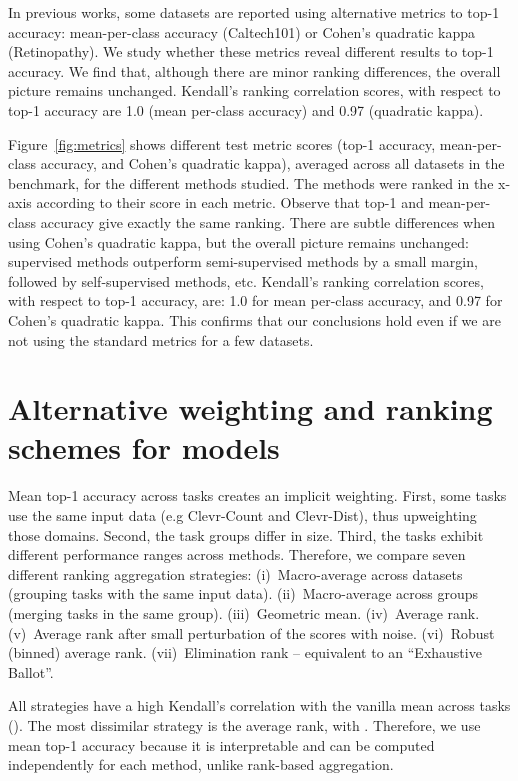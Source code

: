 \documentclass{article}
\begin{document}
In previous works, some datasets are
reported using alternative metrics to top-1 accuracy:
mean-per-class accuracy (Caltech101)
or Cohen's quadratic kappa (Retinopathy).
We study whether these metrics reveal different results to top-1 accuracy.
We find that, although there are minor ranking differences, the overall picture remains unchanged.
Kendall's ranking correlation scores, with respect to top-1 accuracy are 1.0 (mean per-class accuracy) and 0.97 (quadratic kappa).

Figure~\ref{fig:metrics} shows different test metric scores
(top-1 accuracy, mean-per-class accuracy, and Cohen's quadratic kappa),
averaged across all datasets in the benchmark, for the different methods
studied. The methods were ranked in the x-axis according to their score 
in each metric.
Observe that top-1 and mean-per-class accuracy give exactly the same
ranking. There are subtle differences when using
Cohen's quadratic kappa, but the overall picture
remains unchanged: supervised methods outperform semi-supervised methods
by a small margin, followed by self-supervised methods, etc.
Kendall's ranking correlation scores, with respect to top-1 accuracy, are:
1.0 for mean per-class accuracy, and 0.97 for Cohen's quadratic kappa.
This confirms that our conclusions hold even if we are not using the standard
metrics for a few datasets.


\clearpage
\section{Alternative weighting and ranking schemes for models\label{app:alt-model-ranking}}

Mean top-1 accuracy across tasks creates an implicit weighting.
First, some tasks use the same input data (e.g Clevr-Count and Clevr-Dist), thus upweighting those domains.
Second, the task groups differ in size.
Third, the tasks exhibit different performance ranges across methods.
Therefore, we compare seven different ranking aggregation strategies:
(i)~Macro-average across datasets (grouping tasks with the same input data).
(ii)~Macro-average across groups (merging tasks in the same group).
(iii)~Geometric mean.
(iv)~Average rank.
(v)~Average rank after small perturbation of the scores with noise.
(vi)~Robust (binned) average rank.
(vii)~Elimination rank -- equivalent to an ``Exhaustive Ballot''.

All strategies have a high Kendall's correlation with the vanilla mean across tasks ().
The most dissimilar strategy is the average rank, with .
Therefore, we use mean top-1 accuracy because it is interpretable and can be computed independently for each method, unlike rank-based aggregation.
\end{document}
